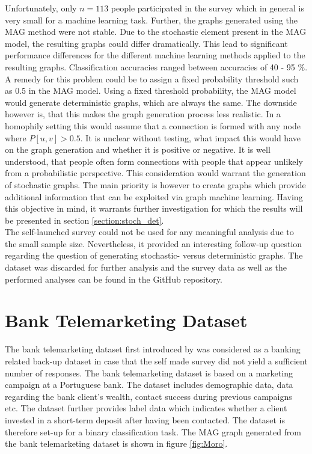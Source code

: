   \noindent Unfortunately, only $n=113$ people participated in the survey which 
  in general is very small for a machine learning task.
  Further, the graphs generated using the MAG method were not stable. Due to
  the stochastic element present in the MAG model, the resulting graphs could
  differ dramatically. This lead to significant performance differences for the
  different machine learning methods applied to the resulting graphs.
  Classification accuracies ranged between accuracies of 40 - 95 \%. A remedy
  for this problem could be to assign a fixed probability threshold such as 0.5
  in the MAG model. Using a fixed threshold probability, the MAG model would 
  generate deterministic graphs, which are always the same. The downside however 
  is, that this makes the graph generation process less realistic. In a
  homophily setting this would assume that a connection is formed with any node 
  where $P[u,v]>0.5$. It is unclear without testing, what impact this would
  have on the graph generation and whether it is positive or negative. It is
  well understood, that people often form connections with people that appear
  unlikely from a probabilistic perspective. This consideration would warrant
  the generation of stochastic graphs. The main priority is however to create
  graphs which provide additional information that can be exploited via graph
  machine learning. Having this objective in mind, it warrants further
  investigation for which the results will be presented in section 
  \ref{section:stoch_det}. \\

  \noindent The self-launched survey could not be used for any meaningful
  analysis due to the small sample size. Nevertheless, it provided an
  interesting follow-up question regarding the question of generating
  stochastic- versus deterministic graphs. The dataset was discarded for
  further analysis and the survey data as well as the performed analyses can be
  found in the GitHub repository. 

  \section{Bank Telemarketing Dataset}
  \label{section:bank_data}

  The bank telemarketing dataset first introduced by 
  \cite{moro2011using,moro2014data} was considered as a banking related back-up 
  dataset in case that the self made survey did not yield a sufficient number of 
  responses. The bank telemarketing dataset is based on a marketing campaign at 
  a Portuguese bank. The dataset includes demographic data, data regarding the 
  bank client's wealth, contact success during previous campaigns etc. The
  dataset further provides label data which indicates whether a client invested
  in a short-term deposit after having been contacted. The dataset is therefore
  set-up for a binary classification task. The MAG graph generated from the
  bank telemarketing dataset is shown in figure \ref{fig:Moro}.
 

